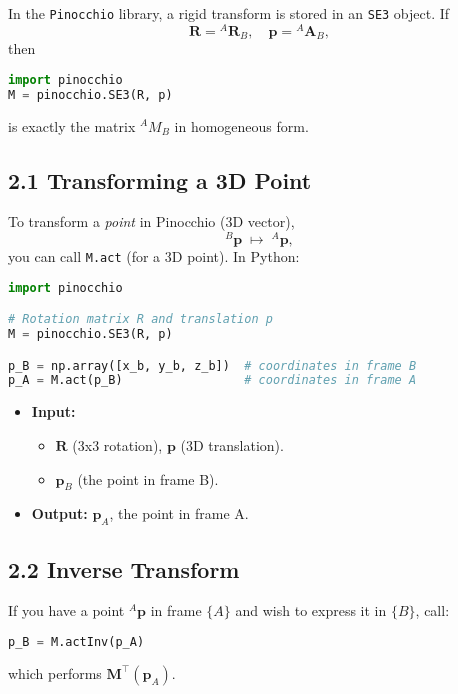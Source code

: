 \documentclass[10pt]{article}
\begin{document}
In the \texttt{Pinocchio} library, a rigid transform is stored in an \texttt{SE3} object.  If
\[
\mathbf{R} = {}^{A}\mathbf{R}_{B}, 
\quad
\mathbf{p} = {}^{A}\mathbf{A}_{B},
\]
then

\begin{lstlisting}[language=Python]
import pinocchio
M = pinocchio.SE3(R, p)
\end{lstlisting}

is exactly the matrix 
\(\displaystyle
{}^{A}\!M_{B}
\)
in homogeneous form.

\subsection*{2.1 Transforming a 3D Point}
To transform a \emph{point} in Pinocchio (3D vector),
\[
{}^{B}\mathbf{p} \;\mapsto\; {}^{A}\mathbf{p},
\]
you can call \texttt{M.act} (for a 3D point). In Python:

\begin{lstlisting}[language=Python]
import pinocchio

# Rotation matrix R and translation p
M = pinocchio.SE3(R, p)

p_B = np.array([x_b, y_b, z_b])  # coordinates in frame B
p_A = M.act(p_B)                 # coordinates in frame A
\end{lstlisting}


\begin{itemize}
\item \textbf{Input:} 
  \begin{itemize}
    \item \(\mathbf{R}\) (3x3 rotation), \(\mathbf{p}\) (3D translation).
    \item \(\mathbf{p}_B\) (the point in frame B).
  \end{itemize}
\item \textbf{Output:} \(\mathbf{p}_A\), the point in frame A.
\end{itemize}

\subsection*{2.2 Inverse Transform}
If you have a point \({}^{A}\mathbf{p}\) in frame \(\{A\}\) and wish to express it in \(\{B\}\), call:
\begin{lstlisting}[language=Python]
p_B = M.actInv(p_A)
\end{lstlisting}
which performs \(\mathbf{M}^\top(\mathbf{p}_A)\).
\end{document}
